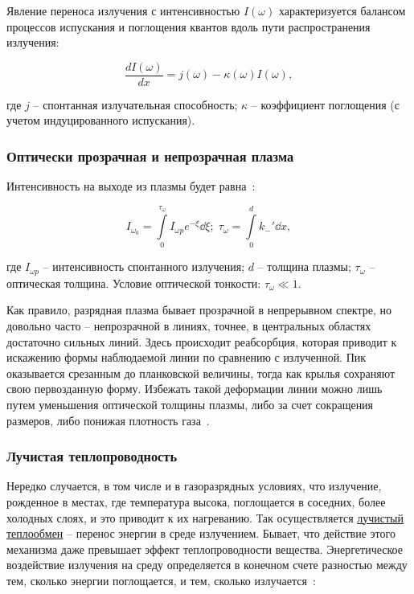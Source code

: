 \documentclass[10pt, a4paper]{article}
\begin{document}
\begin{enumerate}
	Явление переноса излучения с интенсивностью $I(\omega)$ характеризуется балансом процессов испускания и поглощения
	квантов вдоль пути распространения излучения:
	
	\begin{equation}
		\frac{dI(\omega)}{dx}=j(\omega)-\kappa(\omega)I(\omega),
	\end{equation}

	где $j$ -- спонтанная излучательная способность; $\kappa$ -- коэффициент поглощения (с учетом индуцированного испускания).
	
\end{enumerate}

\subsubsection{Оптически прозрачная и непрозрачная плазма}

Интенсивность на выходе из плазмы будет равна~\cite{raizer}:

\begin{equation*}
	I_{\omega_0} = \int\limits_0^{\tau_\omega} I_{\omega p}e^{-\xi}\dd{\xi}; \; \tau_\omega = \int\limits_0^dk_{-}'\dd{x},
\end{equation*}

где $I_{\omega p}$ -- интенсивность спонтанного излучения; $d$ -- толщина плазмы; $\tau_\omega$ -- оптическая толщина. Условие оптической тонкости: $\tau_\omega\ll1$.

Как правило, разрядная плазма бывает прозрачной в непрерывном спектре, но довольно часто -- непрозрачной в линиях, точнее, в центральных областях достаточно сильных линий. Здесь происходит реабсорбция, которая приводит к искажению формы наблюдаемой линии по сравнению с излученной. Пик оказывается срезанным до планковской величины, тогда как крылья сохраняют свою первозданную форму. Избежать такой деформации линии можно лишь путем уменьшения оптической толщины плазмы, либо за счет сокращения размеров, либо понижая плотность газа~\cite{raizer}.	

\subsubsection{Лучистая теплопроводность}

Нередко случается, в том числе и в газоразрядных условиях, что излучение, рожденное в местах, где температура высока, поглощается в соседних, более холодных слоях, и это приводит к их нагреванию. Так осуществляется \uline{лучистый теплообмен} -- перенос энергии в среде излучением. Бывает, что действие этого механизма даже превышает эффект теплопроводности вещества. Энергетическое воздействие излучения на среду определяется в конечном счете разностью между тем, сколько энергии поглощается, и тем, сколько излучается~\cite{raizer}:
\end{document}
